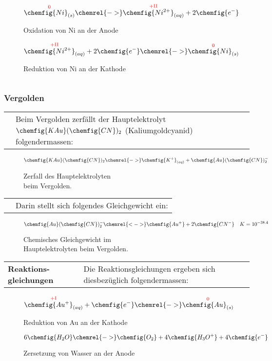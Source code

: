 \begin{figure}[H]\centering
	$$\overset{\mathrm{\color{red}{0}}}{\chemfig{Ni}_{(s)}} \chemrel{->} \overset{\mathrm{\color{red}{+II}}}{\chemfig{Ni^{2+}}_{(aq)}} + 2\chemfig{e^{-}}$$
	\caption{Oxidation von Ni an der Anode}
	$$\overset{\mathrm{\color{red}{+II}}}{\chemfig{Ni^{2+}}_{(aq)}} + 2\chemfig{e^{-}} \chemrel{->} \overset{\mathrm{\color{red}{0}}}{\chemfig{Ni}_{(s)}}$$
	\caption{Reduktion von Ni an der Kathode}
\end{figure}

\begin{longtable}{p{3cm}p{14cm}}
    & \\
    \hline
\end{longtable}

\subsubsection{Vergolden}
\begin{longtable}{p{3cm}p{14cm}}
    & Beim Vergolden zerfällt der Hauptelektrolyt $\chemfig{KAu}(\chemfig{CN})_{2}$ (Kaliumgoldcyanid) folgendermassen:
\end{longtable}

\begin{figure}[H]\centering
    $$\chemfig{KAu}(\chemfig{CN})_{2} \chemrel{->} \chemfig{K^{+}}_{(aq)} + \chemfig{Au}(\chemfig{CN})^{-}_2$$
    \caption{Zerfall des Hauptelektrolyten\\ beim Vergolden.}
\end{figure}

\newpage

\begin{longtable}{p{3cm}p{14cm}}
    & Darin stellt sich folgendes Gleichgewicht ein:
\end{longtable}

\begin{figure}[H]\centering
    $$\chemfig{Au}(\chemfig{CN})^{-}_2 \chemrel{<->} \chemfig{Au^{+}} + 2\chemfig{CN^{-}} \quad K = 10^{-38.4}$$
    \caption{Chemisches Gleichgewicht im\\ Hauptelektrolyten beim Vergolden.}
\end{figure}

\begin{longtable}{p{3cm}p{14cm}}
    \hline
    \textbf{Reaktions-gleichungen}
    & Die Reaktionsgleichungen ergeben sich diesbezüglich folgendermassen:\\
\end{longtable}

\begin{figure}[H]\centering
    $$\overset{\mathrm{\color{red}{+I}}}{\chemfig{Au^{+}}_{(aq)}} + \chemfig{e^{-}} \chemrel{->} \overset{\mathrm{\color{red}{0}}}{\chemfig{Au}_{(s)}}$$
    \caption{Reduktion von Au an der Kathode}
    $$6\chemfig{H_2O} \chemrel{->} \chemfig{O_2} + 4\chemfig{H_3O^{+}} + 4\chemfig{e^{-}}$$
    \caption{Zersetzung von Wasser an der Anode}
\end{figure}